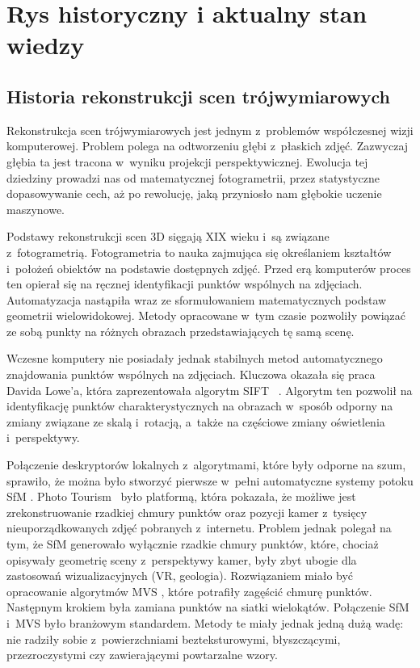 \chapter{Rys historyczny i aktualny stan wiedzy}
\label{chap:stan-wiedzy}


\section{Historia rekonstrukcji scen trójwymiarowych}
\label{sec:historia}

Rekonstrukcja scen trójwymiarowych jest jednym z~problemów współczesnej wizji
komputerowej. Problem polega na odtworzeniu głębi z~płaskich zdjęć.
Zazwyczaj głębia ta jest tracona w~wyniku projekcji perspektywicznej.
Ewolucja tej dziedziny prowadzi nas od matematycznej fotogrametrii, przez
statystyczne dopasowywanie cech, aż po rewolucję, jaką przyniosło nam głębokie
uczenie maszynowe.

Podstawy rekonstrukcji scen 3D sięgają XIX wieku i~są związane
z~fotogrametrią. Fotogrametria to nauka zajmująca się określaniem kształtów
i~położeń obiektów na podstawie dostępnych zdjęć. Przed erą komputerów proces
ten opierał się na ręcznej identyfikacji punktów wspólnych na zdjęciach.
Automatyzacja nastąpiła wraz ze sformułowaniem matematycznych podstaw geometrii
wielowidokowej. Metody opracowane w~tym czasie pozwoliły powiązać ze sobą
punkty na różnych obrazach przedstawiających tę samą scenę.

Wczesne komputery nie posiadały jednak stabilnych metod automatycznego
znajdowania punktów wspólnych na zdjęciach. Kluczowa okazała się praca
Davida Lowe'a, która zaprezentowała algorytm SIFT ~\cite{lowe2004sift}. Algorytm ten pozwolił na identyfikację punktów
charakterystycznych na obrazach w~sposób odporny na zmiany związane ze skalą
i~rotacją, a~także na częściowe zmiany oświetlenia i~perspektywy.

Połączenie deskryptorów lokalnych z~algorytmami, które były odporne na szum,
sprawiło, że można było stworzyć pierwsze w~pełni automatyczne systemy potoku SfM
. Photo Tourism~\cite{snavely2006phototourism} było
platformą, która pokazała, że możliwe jest zrekonstruowanie rzadkiej chmury
punktów oraz pozycji kamer z~tysięcy nieuporządkowanych zdjęć pobranych
z~internetu. Problem jednak polegał na tym, że SfM generowało wyłącznie rzadkie
chmury punktów, które, chociaż opisywały geometrię sceny z~perspektywy kamer,
były zbyt ubogie dla zastosowań wizualizacyjnych (VR, geologia). Rozwiązaniem
miało być opracowanie algorytmów MVS , które potrafiły
zagęścić chmurę punktów. Następnym krokiem była zamiana punktów na siatki
wielokątów. Połączenie SfM i~MVS było branżowym standardem. Metody te miały
jednak jedną dużą wadę: nie radziły sobie z~powierzchniami bezteksturowymi,
błyszczącymi, przezroczystymi czy zawierającymi powtarzalne wzory.

